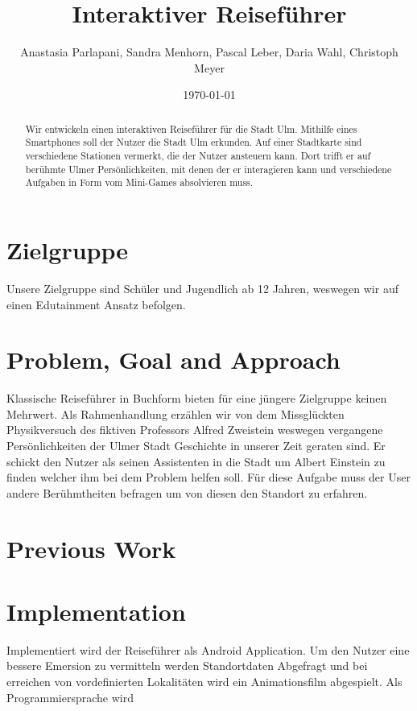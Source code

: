 \documentclass[]{hci-proposal}
\title{Interaktiver Reiseführer}
\author{Anastasia Parlapani, Sandra Menhorn, Pascal Leber, Daria Wahl, Christoph Meyer}
\date{\today}
\begin{document}

\maketitle

\begin{abstract}
  Wir entwickeln einen interaktiven Reiseführer für die Stadt Ulm. Mithilfe eines Smartphones soll
  der Nutzer die Stadt Ulm erkunden. Auf einer Stadtkarte sind verschiedene Stationen vermerkt, die
  der Nutzer ansteuern kann. Dort trifft er auf berühmte Ulmer Persönlichkeiten, mit denen der er
  interagieren kann und verschiedene Aufgaben in Form vom Mini-Games absolvieren muss. 
  
  
  
\end{abstract}


\section{Zielgruppe}
Unsere Zielgruppe sind Schüler und Jugendlich ab 12 Jahren, weswegen wir auf einen Edutainment Ansatz befolgen.


\section{Problem, Goal and Approach}
Klassische Reiseführer in Buchform bieten für eine jüngere Zielgruppe keinen Mehrwert.
Als Rahmenhandlung erzählen wir von dem Missglückten Physikversuch des fiktiven Professors Alfred Zweistein weswegen vergangene Persönlichkeiten der Ulmer Stadt Geschichte in unserer Zeit geraten sind.
Er schickt den Nutzer als seinen Assistenten in die Stadt um Albert Einstein zu finden welcher ihm bei dem Problem helfen soll.
Für diese Aufgabe muss der User andere Berühmtheiten befragen um von diesen den Standort zu erfahren.


\section{Previous Work}


\section{Implementation}
Implementiert wird der Reiseführer als Android Application. Um den Nutzer eine bessere Emersion  zu vermitteln werden Standortdaten Abgefragt und bei erreichen von vordefinierten Lokalitäten wird ein Animationsfilm abgespielt.
Als Programmiersprache wird 
\end{document}
